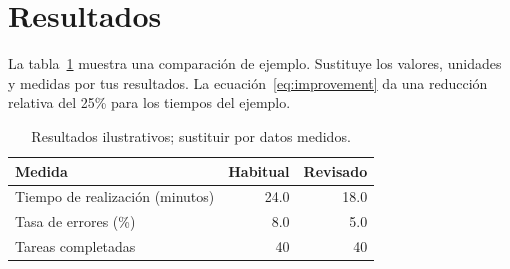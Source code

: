\section{Resultados}
La tabla~\ref{tab:results} muestra una comparación de ejemplo. Sustituye los valores,
unidades y medidas por tus resultados. La ecuación~\ref{eq:improvement} da una
reducción relativa del 25\% para los tiempos del ejemplo.
\begin{table}[htbp]
\centering
\caption{Resultados ilustrativos; sustituir por datos medidos.}
\label{tab:results}
\begin{tabularx}{\linewidth}{@{}Xrr@{}}
\toprule
\textbf{Medida} & \textbf{Habitual} & \textbf{Revisado}\\
\midrule
Tiempo de realización (minutos) & 24.0 & 18.0\\
Tasa de errores (\%) & 8.0 & 5.0\\
Tareas completadas & 40 & 40\\
\bottomrule
\end{tabularx}
\end{table}
